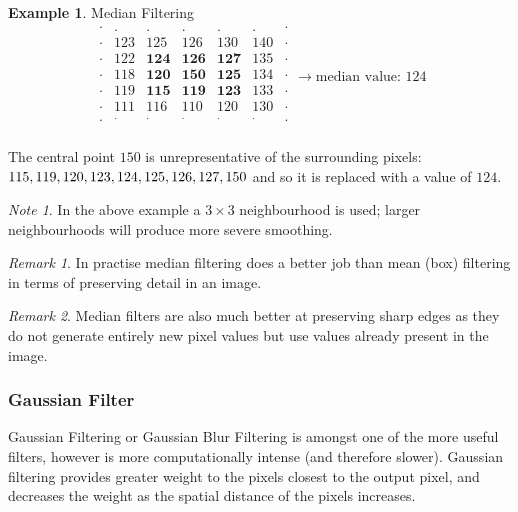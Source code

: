 \documentclass{article}
\theoremstyle{definition}
\newtheorem{ex}{Example}[subsection]
\theoremstyle{remark}
\newtheorem*{rem}{Remark}
\newtheorem*{nb}{Note}
\begin{document}
\begin{ex} Median Filtering
\begin{equation}
    \begin{matrix}
	\cdot & .  & . & .  & . & . & \cdot \\
	\cdot & 123 & 125  & 126  & 130  & 140 & \cdot \\
	\cdot & 122 & \pmb{124} & \pmb{126} & \pmb{127} & 135 & \cdot \\
	\cdot & 118 & \pmb{120} & \pmb{150} & \pmb{125} & 134 & \cdot \\
	\cdot & 119 & \pmb{115} & \pmb{119} & \pmb{123} & 133 & \cdot \\
	\cdot & 111 & 116  & 110  & 120  & 130 & \cdot \\
	\cdot & ^.  & ^. & ^.  & ^. & ^. & \cdot\\
    \end{matrix} \rightarrow \text{median value: 124} 
\end{equation}

The central point $ 150 $ is unrepresentative of the surrounding pixels: $ 115, 119, 120,\\ 123, 124, 125, 126, 127, 150 $ and so it is replaced with a value of $ 124 $. 
\end{ex}

\begin{nb}
In the above example a $ 3 \times 3 $ neighbourhood is used; larger neighbourhoods will produce more severe smoothing.\\
\end{nb}

\begin{rem}
    In practise median filtering does a better job than mean (box) filtering in terms of preserving detail in an image.\\
\end{rem}

\begin{rem}
Median filters are also much better at preserving sharp edges as they do not generate entirely new pixel values but use values already present in the image.\\
\end{rem}

\subsubsection{Gaussian Filter}

Gaussian Filtering or Gaussian Blur Filtering is amongst one of the more useful filters, however is more computationally intense (and therefore slower). Gaussian filtering provides greater weight to the pixels closest to the output pixel, and decreases the weight as the spatial distance of the pixels increases. 
\end{document}

